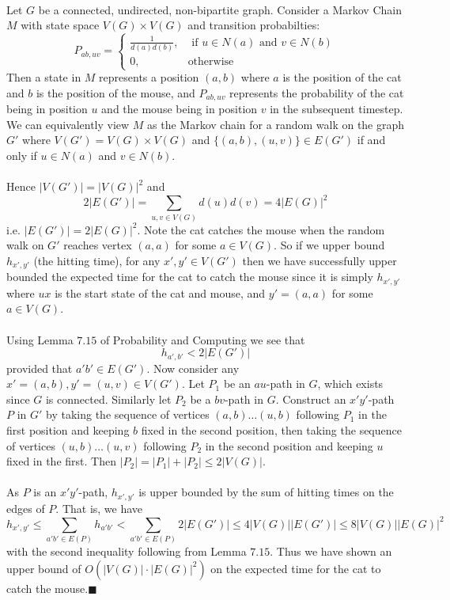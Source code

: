 \documentclass[letterpaper,12pt,oneside,onecolumn]{article}
\begin{document}
\paragraph{}
Let $G$ be a connected, undirected, non-bipartite graph. Consider a Markov Chain $M$ with state space $V(G) \times V(G)$ and transition probabilties:
$$P_{ab, uv} = \begin{cases}
\frac{1}{d(a)d(b)}, &\text{ if } u \in N(a)\text{ and } v \in N(b) \\
0, &\text{otherwise}
\end{cases}$$
Then a state in $M$ represents a position $(a,b)$ where $a$ is the position of the cat and $b$ is the position of the mouse, and $P_{ab,uv}$ represents the probability of the cat being in position $u$ and the mouse being in position $v$ in the subsequent timestep. We can equivalently view $M$ as the Markov chain for a random walk on the graph $G'$ where $V(G') = V(G) \times V(G)$ and $\{(a,b), (u,v)\} \in E(G')$ if and only if $u \in N(a)$ and $v \in N(b)$.
\paragraph{}
Hence $|V(G')| = |V(G)|^2$ and 
$$2|E(G')| = \sum_{u,v \in V(G)} d(u)d(v) = 4|E(G)|^2$$
i.e. $|E(G')| = 2|E(G)|^2$. Note the cat catches the mouse when the random walk on $G'$ reaches vertex $(a,a)$ for some $a \in V(G)$. So if we upper bound $h_{x',y'}$ (the hitting time), for any $x', y' \in V(G')$ then we have successfully upper bounded the expected time for the cat to catch the mouse since it is simply $h_{x',y'}$ where $ux$ is the start state of the cat and mouse, and $y' = (a,a)$ for some $a \in V(G)$.
\paragraph{}
Using Lemma $7.15$ of Probability and Computing we see that 
$$h_{a',b'} < 2|E(G')|$$
provided that $a'b' \in E(G')$. Now consider any $x'=(a,b), y'=(u,v) \in V(G')$. Let $P_1$ be an $au$-path in $G$, which exists since $G$ is connected. Similarly let $P_2$ be a $bv$-path in $G$. Construct an $x'y'$-path $P$ in $G'$ by taking the sequence of vertices $(a,b) \dots (u,b)$ following $P_1$ in the first position and keeping $b$ fixed in the second position, then taking the sequence of vertices $(u,b) \dots (u,v)$ following $P_2$ in the second position and keeping $u$ fixed in the first. Then $|P_2|  = |P_1| + |P_2| \leq 2|V(G)|$.
\paragraph{}
As $P$ is an $x'y'$-path, $h_{x',y'}$ is upper bounded by the sum of hitting times on the edges of $P$. That is, we have
$$h_{x',y'} \leq \sum_{a'b' \in E(P)} h_{a'b'} <  \sum_{a'b' \in E(P)} 2|E(G')| \leq 4|V(G)||E(G')| \leq 8|V(G)||E(G)|^2$$
with the second inequality following from Lemma $7.15$. Thus we have shown an upper bound of $O(|V(G)|\cdot|E(G)|^2)$ on the expected time for the cat to catch the mouse.$\blacksquare$
\end{document}
